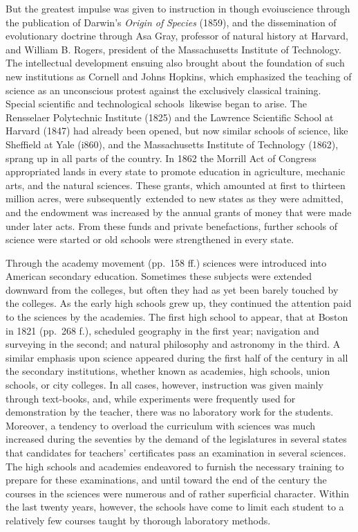 \documentclass[
]{book}
\begin{document}
But the greatest impulse was given to instruction in though evoiuscience through the publication of Darwin's \emph{Origin of} \emph{Species} (1859), and the dissemination of evolutionary doctrine through Asa Gray, professor of natural history at Harvard, and William B. Rogers, president of the Massachusetts Institute of Technology. The intellectual development ensuing also brought about the foundation of such new institutions as Cornell and Johns Hopkins, which emphasized the teaching of science as an unconscious protest against the exclusively classical training. Special scientific and technological schools~likewise began to arise. The Rensselaer Polytechnic Institute (1825) and the Lawrence Scientific School at Harvard (1847) had already been opened, but now similar schools of science, like Sheffield at Yale (i860), and the Massachusetts Institute of Technology (1862), sprang up in all parts of the country. In 1862 the Morrill Act of Congress appropriated lands in every state to promote education in agriculture, mechanic arts, and the natural sciences. These grants, which amounted at first to thirteen million acres, were subsequently~extended to new states as they were admitted, and the endowment was increased by the annual grants of money that were made under later acts. From these funds and private benefactions, further schools of science were started or old schools were strengthened in every state.

Through the academy movement (pp.~158 ff.) sciences were introduced into American secondary education. Sometimes these subjects were extended downward from the colleges, but often they had as yet been barely touched by the colleges. As the early high schools grew up, they continued the attention paid to the sciences by the academies. The first high school to appear, that at Boston in 1821 (pp.~268 f.), scheduled geography in the first year; navigation and surveying in the second; and natural philosophy and astronomy in the third. A similar emphasis upon science appeared during the first half of the century in all the secondary institutions, whether known as academies, high schools, union schools, or city colleges. In all cases, however, instruction was given mainly through text-books, and, while experiments were frequently used for demonstration by the teacher, there was no laboratory work for the students. Moreover, a tendency to overload the curriculum with sciences was much increased during the seventies by the demand of the legislatures in several states that candidates for teachers' certificates pass an examination in several sciences. The high schools and academies endeavored to furnish the necessary training to prepare for these examinations, and until toward the end of the century the courses in the sciences were numerous and of rather superficial character. Within the last twenty years, however, the schools have come to limit each student to a relatively few courses taught by thorough laboratory methods.
\end{document}
